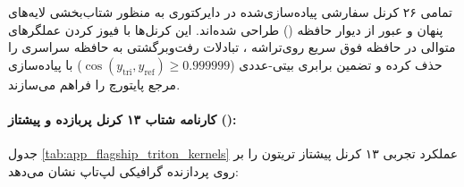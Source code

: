 تمامی ۲۶ کرنل سفارشی پیاده‌سازی‌شده در دایرکتوری  به منظور شتاب‌بخشی لایه‌های پنهان و عبور از دیوار حافظه () طراحی شده‌اند. این کرنل‌ها با فیوز کردن عملگرهای متوالی در حافظه فوق سریع روی‌تراشه ، تبادلات رفت‌وبرگشتی به حافظه سراسری  را حذف کرده و تضمین برابری بیتی-عددی ($\cos(y_{\text{tri}}, y_{\text{ref}}) \ge 0.999999$) با پیاده‌سازی مرجع پایتورچ را فراهم می‌سازند.

\paragraph{کارنامه شتاب ۱۳ کرنل پربازده و پیشتاز ():}
جدول \ref{tab:app_flagship_triton_kernels} عملکرد تجربی ۱۳ کرنل پیشتاز تریتون را بر روی پردازنده گرافیکی لپ‌تاپ  نشان می‌دهد:

